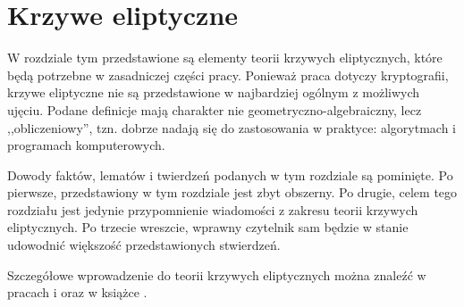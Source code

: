 \chapter{Krzywe eliptyczne}

W rozdziale tym przedstawione są elementy teorii krzywych eliptycznych,
które będą potrzebne w zasadniczej części pracy.
Ponieważ praca dotyczy kryptografii,
krzywe eliptyczne nie są przedstawione
w najbardziej ogólnym z możliwych ujęciu.
Podane definicje mają charakter nie geometryczno-algebraiczny,
lecz ,,obliczeniowy'',
tzn. dobrze nadają się do zastosowania w praktyce:
algorytmach i programach komputerowych.

Dowody faktów, lematów i twierdzeń podanych w tym rozdziale są pominięte.
Po pierwsze, przedstawiony w tym rozdziale jest zbyt obszerny.
Po drugie, celem tego rozdziału jest jedynie przypomnienie wiadomości
z zakresu teorii krzywych eliptycznych.
Po trzecie wreszcie,
wprawny czytelnik sam będzie w stanie udowodnić
większość przedstawionych stwierdzeń.

Szczegółowe wprowadzenie do teorii krzywych eliptycznych
można znaleźć w pracach \cite{ecintro1} i \cite{ecintro2}
oraz w książce \cite{silverman}.






